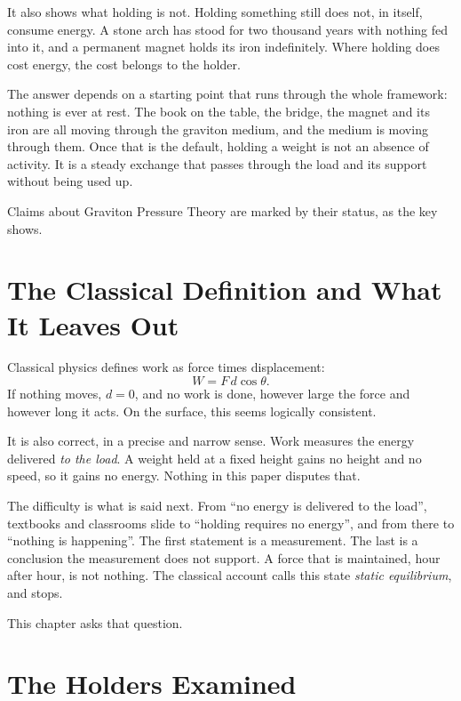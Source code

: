 \documentclass[11pt,a4paper]{article}
\begin{document}
It also shows what holding is not. Holding something still does not, in itself, consume energy. A stone arch has stood for two thousand years with nothing fed into it, and a permanent magnet holds its iron indefinitely. Where holding does cost energy, the cost belongs to the holder.

The answer depends on a starting point that runs through the whole framework: nothing is ever at rest. The book on the table, the bridge, the magnet and its iron are all moving through the graviton medium, and the medium is moving through them. Once that is the default, holding a weight is not an absence of activity. It is a steady exchange that passes through the load and its support without being used up.

Claims about Graviton Pressure Theory are marked by their status, as the key shows.

\statuskey

\section{The Classical Definition and What It Leaves Out}

Classical physics defines work as force times displacement:
\[
W = F\,d\cos\theta .
\]
If nothing moves, $d=0$, and no work is done, however large the force and however long it acts. On the surface, this seems logically consistent.

It is also correct, in a precise and narrow sense. Work measures the energy delivered \emph{to the load}. A weight held at a fixed height gains no height and no speed, so it gains no energy. Nothing in this paper disputes that.

The difficulty is what is said next. From ``no energy is delivered to the load'', textbooks and classrooms slide to ``holding requires no energy'', and from there to ``nothing is happening''. The first statement is a measurement. The last is a conclusion the measurement does not support. A force that is maintained, hour after hour, is not nothing. The classical account calls this state \emph{static equilibrium}, and stops. 

This chapter asks that question.

\section{The Holders Examined}
\end{document}

